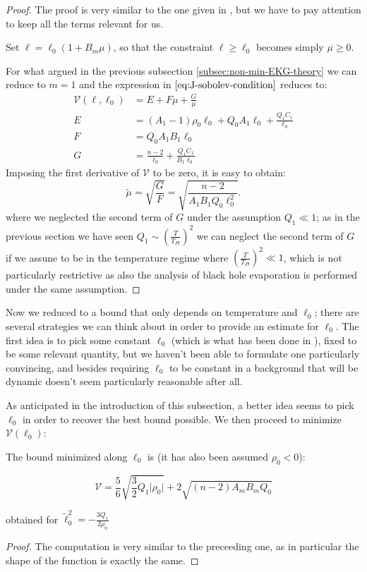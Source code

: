 \begin{proof}
    The proof is very similar to the one given in \cite{fewster2020new}, but we have to pay attention to keep all the terms relevant for us.

    Set \(\ell = \ell_0\left(1 + B_m\mu\right)\), so that the constraint \(\ell\ge\ell_0\) becomes simply \(\mu \ge 0\).

    For what argued in the previous subsection \ref{subsec:non-min-EKG-theory} we can reduce to \(m = 1\) and the expression in \(\eqref{eq:J-sobolev-condition}\) reduces to:
    \begin{align*}
        \mathcal{V}(\ell, \ell_0) &= E + F\mu + \frac{G}{\mu} \\
        E &= (A_1 - 1)\rho_0\ell_0 + Q_0A_1\ell_0 + \frac{Q_1C_1}{\ell_0}\\
        F &= Q_0A_1B_1\ell_0 \\
        G &= \frac{n- 2}{\ell_0} + \frac{Q_1C_1}{B_1\ell_0}
    \end{align*}
    Imposing the first derivative of \(\mathcal{V}\) to be zero, it is easy to obtain:
    \[
    \tilde{\mu} = \sqrt{\frac{G}{F}} =  \sqrt{\frac{n - 2}{A_1B_1Q_0\ell_0^2}}.
    \]
	where we neglected the second term of \(G\) under the assumption \(Q_1 \ll 1\); as in the previous section we have seen \(Q_1 \sim \left(\frac{T}{T_{Pl}}\right)^2\) we can neglect the second term of \(G\) if we assune to be in the temperature regime where \(\left(\frac{T}{T_{Pl}}\right)^2 \ll 1\), which is not particularly restrictive as also the analysis of black hole evaporation is performed under the same assumption.
\end{proof}

Now we reduced to a bound that only depends on temperature and \(\ell_0\); there are several strategies we can think about in order to provide an estimate for \(\ell_0\). The first idea is to pick some constant \(\ell_0\) (which is what has been done in \cite{fewster2020new}), fixed to be some relevant quantity, but we haven't been able to formulate one particularly convincing, and besides requiring \(\ell_0\) to be constant in a background that will be dynamic doesn't seem particularly reasonable after all.

As anticipated in the introduction of this subsection, a better idea seems to pick \(\ell_0\) in order to recover the best bound possible. We then proceed to minimize \(\mathcal{V}(\ell_0)\):
\begin{prop}
	The bound minimized along \(\ell_0\) is (it has also been assumed \(\rho_0 < 0\)):

	\begin{equation}
		\label{eq:minimized-V}
		\mathcal{V} = \frac{5}{6}\sqrt{\frac{3}{2}Q_1 \vert\rho_0\vert} + 2 \sqrt{(n - 2)A_mB_mQ_0}
	\end{equation}

	obtained for \(\tilde{\ell}_0^2 = - \frac{3Q_1}{2\rho_0}\)
\end{prop}
\begin{proof}
	The computation is very similar to the preceeding one, as in particular the shape of the function is exactly the same.
\end{proof}

